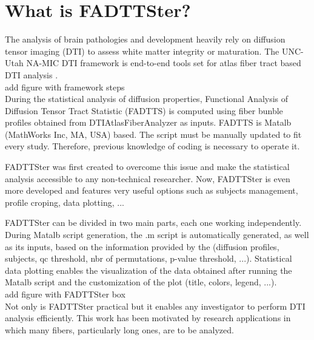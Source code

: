 \documentclass[fadttsterUserGuide_master]{subfiles}
\begin{document}
	\part{What is FADTTSter?}
	The analysis of brain pathologies and development heavily rely on diffusion tensor imaging (DTI) to assess white matter integrity or maturation. The UNC-Utah NA-MIC DTI framework is end-to-end tools set for atlas fiber tract based DTI analysis \citep{unc-utah_namic}.\\
	
	add figure with framework steps\\
	
	During the statistical analysis of diffusion properties, Functional Analysis of Diffusion Tensor Tract Statistic (FADTTS) is computed using fiber bunble profiles obtained from DTIAtlasFiberAnalyzer as inputs.
	FADTTS is Matalb\textsuperscript{\textregistered} (MathWorks Inc, MA, USA) based. The script must be manually updated to fit every study. Therefore, previous knowledge of coding is necessary to operate it.
	
	\newpage	
	FADTTSter was first created to overcome this issue and make the statistical analysis accessible to any non-technical researcher. Now, FADTTSter is even more developed and features very useful options such as subjects management, profile croping, data plotting, ...

	FADTTSter can be divided in two main parts, each one working independently.
	During Matalb\textsuperscript{\textregistered} script generation, the .m script is automatically generated, as well as its inputs, based on the information provided by the (diffusion profiles, subjects, qc threshold, nbr of permutations, p-value threshold, ...).
	Statistical data plotting enables the visualization of the data obtained after running the Matalb\textsuperscript{\textregistered} script and the customization of the plot (title, colors, legend, ...).\\
	
	add figure with FADTTSter box\\
	
	Not only is FADTTSter practical but it enables any investigator to perform DTI analysis efficiently.
	This work has been motivated by research applications in which many fibers, particularly long ones, are to be analyzed.
\end{document}
